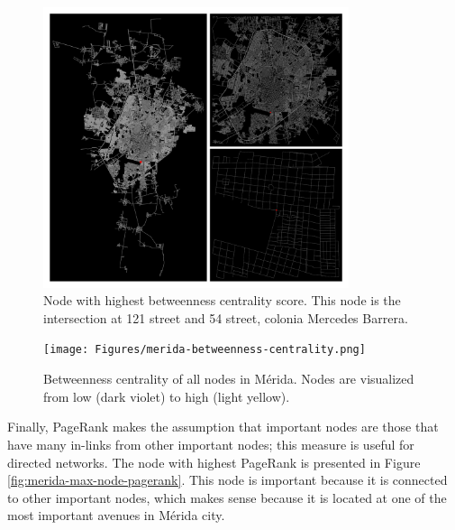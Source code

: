 \begin{figure}[h!]
	\centering
	\includegraphics[width=0.8\textwidth]{Figures/merida-node-betweenness-centrality.png}
	\caption{Node with highest betweenness centrality score. This node is the intersection at 121 street and 54 street, colonia Mercedes Barrera.
		\label{fig:merida-max-node-betweenness-centrality}}
\end{figure}

\begin{figure}[h!]
	\centering
	\texttt{[image: Figures/merida-betweenness-centrality.png]}
	\caption{Betweenness centrality of all nodes in Mérida. Nodes are visualized from low (dark violet) to high (light yellow).
		\label{fig:merida-betweenness-centrality}}
\end{figure}

Finally, PageRank makes the assumption that important nodes are those that have many in-links from other important nodes; this measure is useful for directed networks. The node with highest PageRank is presented in Figure \ref{fig:merida-max-node-pagerank}. This node is important because it is connected to other important nodes, which makes sense because it is located at one of the most important avenues in Mérida city.

